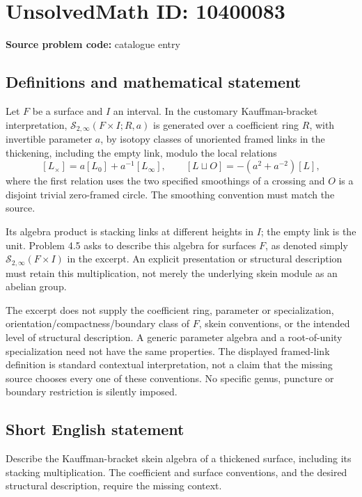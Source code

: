 \documentclass[11pt]{article}
\begin{document}
\section*{UnsolvedMath ID: 10400083}
\textbf{Source problem code:} catalogue entry
\subsection{Definitions and mathematical statement}
Let \(F\) be a surface and \(I\) an interval. In the customary Kauffman-bracket interpretation, \(\mathcal S_{2,\infty}(F\times I;R,a)\) is generated over a coefficient ring \(R\), with invertible parameter \(a\), by isotopy classes of unoriented framed links in the thickening, including the empty link, modulo the local relations
\[
 [L_\times]=a[L_0]+a^{-1}[L_\infty],\qquad
 [L\sqcup O]=-(a^2+a^{-2})[L],
\]
where the first relation uses the two specified smoothings of a crossing and \(O\) is a disjoint trivial zero-framed circle. The smoothing convention must match the source.

Its algebra product is stacking links at different heights in \(I\); the empty link is the unit. Problem 4.5 asks to describe this algebra for surfaces \(F\), as denoted simply \(\mathcal S_{2,\infty}(F\times I)\) in the excerpt. An explicit presentation or structural description must retain this multiplication, not merely the underlying skein module as an abelian group.

The excerpt does not supply the coefficient ring, parameter or specialization, orientation/compactness/boundary class of \(F\), skein conventions, or the intended level of structural description. A generic parameter algebra and a root-of-unity specialization need not have the same properties. The displayed framed-link definition is standard contextual interpretation, not a claim that the missing source chooses every one of these conventions. No specific genus, puncture or boundary restriction is silently imposed.
\subsection{Short English statement}
Describe the Kauffman-bracket skein algebra of a thickened surface, including its stacking multiplication. The coefficient and surface conventions, and the desired structural description, require the missing context.
\end{document}
